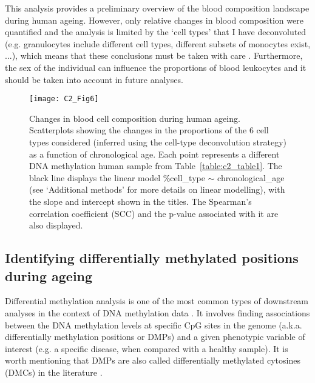 \bigskip

This analysis provides a preliminary overview of the blood composition landscape during human ageing. However, only relative changes in blood composition were quantified and the analysis is limited by the `cell types' that I have deconvoluted (e.g. granulocytes include different cell types, different subsets of monocytes exist, ...), which means that these conclusions must be taken with care \cite{Nikolich-Zugich2018}. Furthermore, the sex of the individual can influence the proportions of blood leukocytes \cite{Chen2016a} and it should be taken into account in future analyses. 

\begin{figure}[htbp!] 
	\centering    
	\texttt{[image: C2\_Fig6]}
	\caption[Changes in blood cell composition during human ageing]{Changes in blood cell composition during human ageing. Scatterplots showing the changes in the proportions of the 6 cell types considered (inferred using the cell-type deconvolution strategy) as a function of chronological age. Each point represents a different DNA methylation human sample from Table~\ref{table:c2_table1}. The black line displays the linear model \%cell\_type $\sim$ chronological\_age (see `Additional methods' for more details on linear modelling), with the slope and intercept shown in the titles. The Spearman's correlation coefficient (\acrshort{SCC}) and the p-value associated with it are also displayed.}
	\label{fig:c2_fig6}
\end{figure}



\smallskip

\subsection{Identifying differentially methylated positions during ageing}

\smallskip

Differential methylation analysis is one of the most common types of downstream analyses in the context of DNA methylation data \cite{Wilhelm-Benartzi2013,Morris2015,Teschendorff2018}. It involves finding associations between the DNA methylation levels at specific CpG sites in the genome (a.k.a. differentially methylation positions or \acrshort{DMPs}) and a given phenotypic variable of interest (e.g. a specific disease, when compared with a healthy sample). It is worth mentioning that DMPs are also called differentially methylated cytosines (\acrshort{DMCs}) in the literature \cite{Teschendorff2018}.

